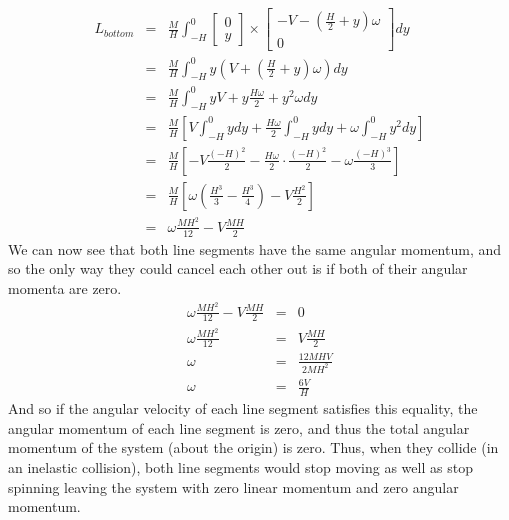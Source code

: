 \documentclass[12pt]{article}
\begin{document}
\begin{eqnarray*}
L_{bottom}
   &=& \frac{M}{H} \int_{-H}^{0}
       \begin{bmatrix}
           0 \\
           y
       \end{bmatrix} \times
       \begin{bmatrix}
           - V - \left( \frac{H}{2} + y \right) \omega \\
           0
       \end{bmatrix} dy \\
   &=& \frac{M}{H} \int_{-H}^{0}
       y \left( V + \left( \frac{H}{2} + y \right) \omega \right) dy \\
   &=& \frac{M}{H} \int_{-H}^{0} y V + y\frac{H \omega}{2} + y^2 \omega dy \\
   &=& \frac{M}{H}
       \left[
           V \int_{-H}^{0} y dy
           + \frac{H \omega}{2} \int_{-H}^{0} y dy
           + \omega \int_{-H}^{0} y^2 dy
       \right] \\
   &=& \frac{M}{H}
       \left[
           - V \frac{\left( - H \right)^2}{2}
           - \frac{H \omega}{2} \cdot \frac{ \left( - H \right)^2}{2}
           - \omega \frac{ \left( - H \right)^3}{3}
       \right] \\
   &=& \frac{M}{H}
       \left[
           \omega \left( \frac{H^3}{3} - \frac{H^3}{4} \right) - V \frac{H^2}{2}
       \right] \\
   &=& \omega \frac{M H^2}{12} - V \frac{M H}{2}
\end{eqnarray*}
We can now see that both line segments have the same angular momentum, and so the only way
they could cancel each other out is if both of their angular momenta are zero.
\begin{eqnarray*}
   \omega \frac{M H^2}{12} - V \frac{M H}{2} &=& 0 \\
   \omega \frac{M H^2}{12} &=& V \frac{M H}{2} \\
   \omega &=& \frac{12 M H V}{2 M H^2} \\
   \omega &=& \frac{6 V}{H}
\end{eqnarray*}
And so if the angular velocity of each line segment satisfies this equality, the angular momentum
of each line segment is zero, and thus the total angular momentum of the system (about the origin)
is zero.  Thus, when they collide (in an inelastic collision), both line segments would stop
moving as well as stop spinning leaving the system with zero linear momentum and zero angular
momentum.
\end{document}

